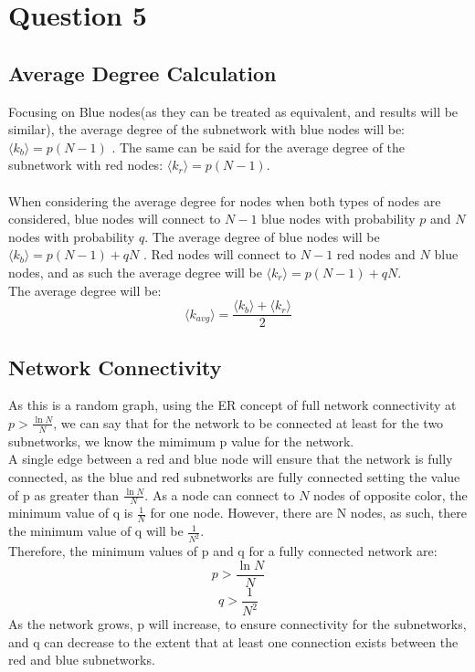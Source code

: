 \documentclass[11pt]{article}
\begin{document}
\section{Question 5}
\subsection{Average Degree Calculation}
Focusing on Blue nodes(as they can be treated as equivalent, and results will be similar), the average degree of the subnetwork with blue nodes will be: $\langle k_b \rangle = p(N-1)$ . The same can be said for the average degree of the subnetwork with red nodes: $\langle k_r \rangle = p(N-1)$.\\ \\
When considering the average degree for nodes when both types of nodes are considered, blue nodes will connect to $N-1$ blue nodes with probability $p$ and $N$ nodes with probability $q$. The average degree of blue nodes will be $\langle k_b \rangle = p(N-1) + qN$ . Red nodes will connect to $N-1$ red nodes and $N$ blue nodes, and as such the average degree will be $\langle k_r \rangle = p(N-1) + qN$.\\
The average degree will be:\\
$$\langle k_{avg} \rangle = \frac{\langle k_b \rangle + \langle k_r \rangle}{2}$$

\subsection{Network Connectivity}
As this is a random graph, using the ER concept of full network connectivity at $ p > \frac{\ln{N}}{N}$, we can say that for the network to be connected at least for the two subnetworks, we know the mimimum p value for the network.\\
A single edge between a red and blue node will ensure that the network is fully connected, as the blue and red subnetworks are fully connected setting the value of p as greater than $\frac{\ln{N}}{N}$. As a node can connect to $N$ nodes of opposite color, the minimum value of q is $\frac{1}{N}$ for one node. However, there are N nodes, as such, there the minimum value of q will be $\frac{1}{N^2}$.\\
Therefore, the minimum values of p and q for a fully connected network are:\\
$$ p > \frac{\ln{N}}{N} $$
$$ q > \frac{1}{N^2} $$
As the network grows, p will increase, to ensure connectivity for the subnetworks, and q can decrease to the extent that at least one connection exists between the red and blue subnetworks.
\end{document}
